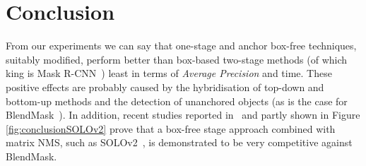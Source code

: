\documentclass[10pt,twocolumn,letterpaper]{article}
\begin{document}



\section{Conclusion}
From our experiments we can say that one-stage and anchor box-free techniques, suitably modified, perform better than box-based two-stage methods (of which king is Mask R-CNN~\cite{Authors1_maskrcnn}) least in terms of \textit{Average Precision} and time. These positive effects are probably caused by the hybridisation of top-down and bottom-up methods and the detection of unanchored objects (as is the case for BlendMask~\cite{Authors2_BlendMask}). In addition, recent studies reported in~\cite{Authors6_SOLOv2} and partly shown in Figure \ref{fig:conclusionSOLOv2} prove that a box-free stage approach combined with matrix NMS, such as SOLOv2~\cite{Authors6_SOLOv2}, is demonstrated to be very competitive against BlendMask.
\end{document}
